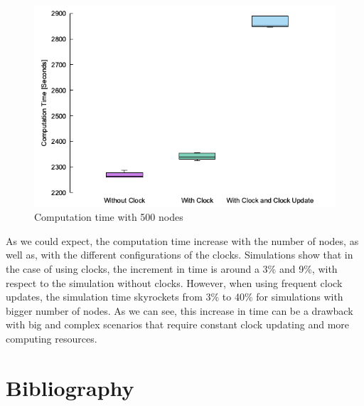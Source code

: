 \documentclass[times, twoside, watermark]{zHenriquesLab-StyleBioRxiv}
\begin{document}
\begin{figure}%
\centering
\includegraphics[width=.8\linewidth]{Figures/computation500.png}
\caption{Computation time with 500 nodes}
\label{fig:500nodes}
\end{figure}

As we could expect, the computation time increase with the number of nodes, as well as, with the different configurations of the clocks. Simulations show that in the case of using clocks, the increment in time is around a 3\% and 9\%, with respect to the simulation without clocks. However, when using frequent clock updates, the simulation time skyrockets from 3\% to 40\% for simulations with bigger number of nodes. As we can see, this increase in time can be a drawback with big and complex scenarios that require constant clock updating and more computing resources. 
\section*{Bibliography}



\captionsetup*{format=largeformat}
\end{document}
